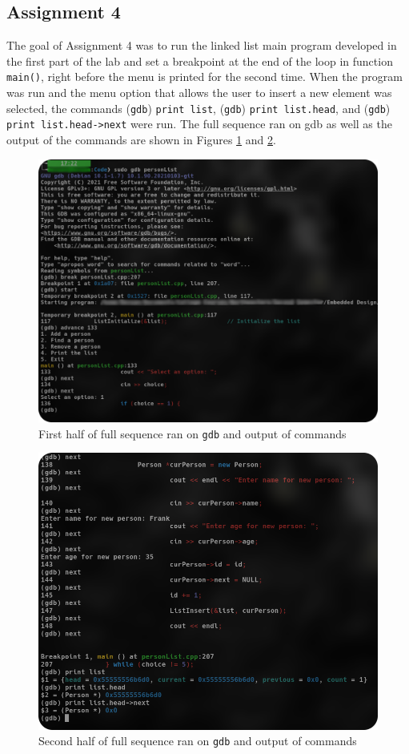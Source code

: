 \documentclass[
	letterpaper, %
	10pt, %
]{CSUniSchoolLabReport}
\begin{document}
\subsection{Assignment 4}

The goal of Assignment 4 was to run the linked list main program developed in the first part of the lab and set a breakpoint at the end of the loop in function \texttt{main()}, right before the menu is printed for the second time. When the program was run and the menu option that allows the user to insert a new element was selected, the commands (\texttt{gdb}) \texttt{print list}, (\texttt{gdb}) \texttt{print list.head}, and (\texttt{gdb}) \texttt{print list.head->next} were run. The full sequence ran on gdb as well as the output of the commands are shown in Figures \ref{fig:6} and \ref{fig:7}.

\begin{figure}[H]
  \centering
  \includegraphics[width=.9\textwidth]{Figures/Assign4.png}
  \caption{First half of full sequence ran on \texttt{gdb} and output of commands}
  \label{fig:6}
\end{figure}

\begin{figure}[H]
  \centering
  \includegraphics[width=.9\textwidth]{Figures/Assign4-2.png}
  \caption{Second half of full sequence ran on \texttt{gdb} and output of commands}
  \label{fig:7}
\end{figure}
\end{document}
